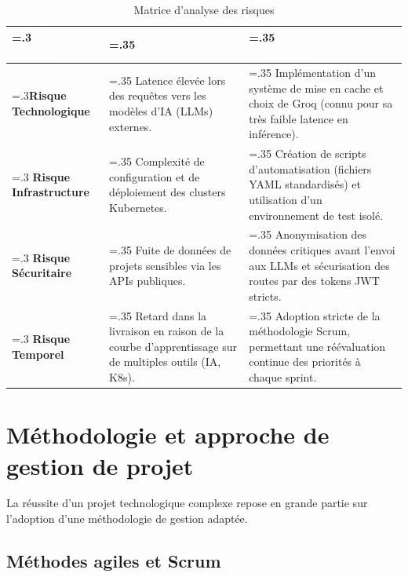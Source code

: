 \begin{table}[H]
  \centering
  \caption{Matrice d'analyse des risques}
  \label{tab:risques}
  \renewcommand{\arraystretch}{1.5}
  \begin{tabularx}{\textwidth}{|>{\hsize=.3\hsize}X|>{\hsize=.35\hsize}X|>{\hsize=.35\hsize}X|}
    \hline
    \rowcolor{tablehead}
    \textcolor{white}{\textbf{Type de Risque}} & \textcolor{white}{\textbf{Description}} & \textcolor{white}{\textbf{Mesures préventives / Solutions}} \\
    \hline
    \textbf{Risque Technologique} & Latence élevée lors des requêtes vers les modèles d'IA (LLMs) externes. & Implémentation d'un système de mise en cache et choix de Groq (connu pour sa très faible latence en inférence). \\
    \hline
    \textbf{Risque Infrastructure} & Complexité de configuration et de déploiement des clusters Kubernetes. & Création de scripts d'automatisation (fichiers YAML standardisés) et utilisation d'un environnement de test isolé. \\
    \hline
    \textbf{Risque Sécuritaire} & Fuite de données de projets sensibles via les APIs publiques. & Anonymisation des données critiques avant l'envoi aux LLMs et sécurisation des routes par des tokens JWT stricts. \\
    \hline
    \textbf{Risque Temporel} & Retard dans la livraison en raison de la courbe d'apprentissage sur de multiples outils (IA, K8s). & Adoption stricte de la méthodologie Scrum, permettant une réévaluation continue des priorités à chaque sprint. \\
    \hline
  \end{tabularx}
\end{table}


\section{Méthodologie et approche de gestion de projet}
\label{sec:methodologie}

La réussite d'un projet technologique complexe repose en grande partie sur l'adoption d'une méthodologie
de gestion adaptée. 

\subsection{Méthodes agiles et Scrum}

